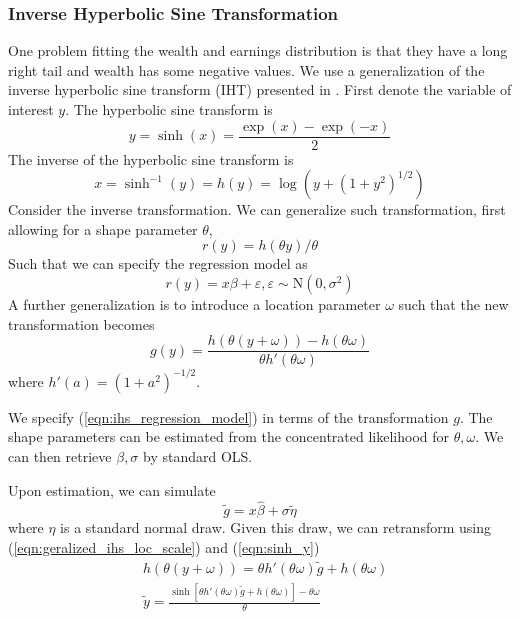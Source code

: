 \subsubsection{Inverse Hyperbolic Sine Transformation}
One problem fitting the wealth and earnings distribution is that they have a long right tail and wealth has some negative values. We use a 
generalization of the inverse hyperbolic sine transform (IHT) presented in \citet{mackinnon1990transforming}. First denote the variable of 
interest $y$. The hyperbolic sine transform is 
\begin{equation}
y = \sinh(x) = \frac{\exp(x) - \exp(-x)}{2}
\label{eqn:sinh_y}
\end{equation}
The inverse of the hyperbolic sine transform is
\[
x = \sinh^{-1}(y) = h(y) = \log(y + (1+y^2)^{1/2})
\]
Consider the inverse transformation. We can generalize such transformation, first allowing for a 
shape parameter $\theta$,
\begin{equation}
r(y) = h(\theta y)/\theta
\label{eqn:generalized_ihs_shape}
\end{equation}
Such that we can specify the regression model as
\begin{equation}
r(y) = x\beta + \varepsilon, \varepsilon \sim \mathrm{N}(0, \sigma^2)
\label{eqn:ihs_regression_model}
\end{equation}
A further generalization is to introduce a location parameter $\omega$ such that the new 
transformation becomes
\begin{equation}
g(y) = \frac{h(\theta(y+\omega)) - h(\theta\omega)}{\theta h'(\theta \omega)}
\label{eqn:geralized_ihs_loc_scale}
\end{equation}
where $h'(a) = (1+a^2)^{-1/2}$. 

We specify (\ref{eqn:ihs_regression_model}) in terms of the transformation $g$. The shape parameters 
can be estimated from the concentrated likelihood for $\theta, \omega$. We can then 
retrieve $\beta, \sigma$ by standard OLS. 

Upon estimation, we can simulate 
\[
\tilde{g} = x \hat{\beta} + \sigma \tilde{\eta}
\]
where $\eta$ is a standard normal draw. Given this draw, we can retransform using 
(\ref{eqn:geralized_ihs_loc_scale}) and (\ref{eqn:sinh_y})
\begin{align*}
&h(\theta(y+\omega)) = \theta h'(\theta\omega)\tilde{g} + h(\theta\omega)\\
&\tilde{y} = \frac{\sinh\left[\theta h'(\theta\omega)\tilde{g} + h(\theta\omega)\right]-\theta\omega}{\theta}
\end{align*}

